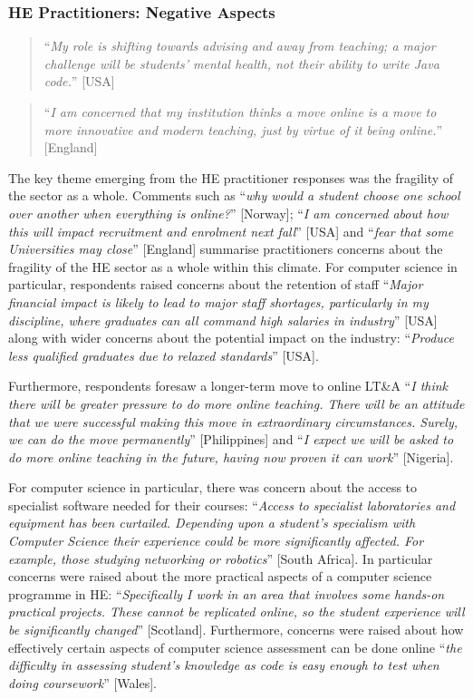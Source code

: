 \documentclass[sigconf]{acmart}
\begin{document}
\subsubsection{HE Practitioners: Negative Aspects}

\begin{quotation}
``{\emph{My role is shifting towards advising and away from
teaching; a major challenge will be students' mental health, not their
ability to write Java code.}}'' [USA]
\end{quotation}

\begin{quotation}
``{\emph{I am concerned that my institution thinks a move online is a
move to more innovative and modern teaching, just by virtue of it
being online.}}'' [England]
\end{quotation}

The key theme emerging from the HE practitioner responses was the
fragility of the sector as a whole. Comments such as ``{\emph{why
would a student choose one school over another when everything is
online?}}'' [Norway]; ``{\emph{I am concerned about how this will
impact recruitment and enrolment next fall}}'' [USA] and ``{\emph{fear
that some Universities may close}}'' [England] summarise practitioners
concerns about the fragility of the HE sector as a whole within this
climate. For computer science in particular, respondents raised
concerns about the retention of staff ``{\emph{Major financial impact
is likely to lead to major staff shortages, particularly in my
discipline, where graduates can all command high salaries in
industry}}'' [USA] along with wider concerns about the potential
impact on the industry: ``{\emph{Produce less qualified graduates due
    to relaxed standards}}'' [USA].

Furthermore, respondents foresaw a longer-term move to online LT\&A
``{\emph{I think there will be greater pressure to do more online
teaching. There will be an attitude that we were successful making
this move in extraordinary circumstances. Surely, we can do the move
permanently}}'' [Philippines] and ``{\emph{I expect we will be asked
to do more online teaching in the future, having now proven it can
work}}'' [Nigeria].

For computer science in particular, there was concern about the access
to specialist software needed for their courses: ``{\emph{Access to
specialist laboratories and equipment has been curtailed. Depending
upon a student’s specialism with Computer Science their experience
could be more significantly affected. For example, those studying
networking or robotics}}'' [South Africa]. In particular concerns were
raised about the more practical aspects of a computer science
programme in HE: ``{\emph{Specifically I work in an area that involves
some hands-on practical projects. These cannot be replicated online,
so the student experience will be significantly changed}}''
[Scotland]. Furthermore, concerns were raised about how effectively certain
aspects of computer science assessment can be done online ``{\emph{the
difficulty in assessing student's knowledge as code is easy enough to
test when doing coursework}}'' [Wales].
\end{document}
